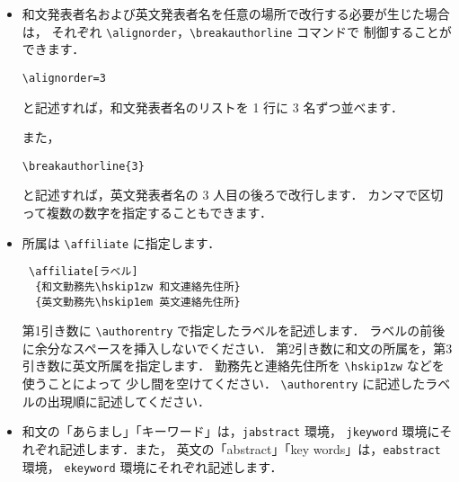 \documentclass[technicalreport]{ieicej}
\begin{document}
\begin{itemize}
\begin{itemize}
\item
第4引き数は発表者の所属ラベルを指定します．
このラベルは，後述する \verb/\affiliate/ の第1引き数に対応します．
ラベルは大学名，企業名，地名などを表す簡潔なものにしてください．
複数の所属がある場合には，カンマ ``,'' でラベルを区切って記述します．

{\bfseries 発表者が一人で所属がない場合}は，
\texttt{none} と指定します．

{\bfseries 発表者が複数で所属のない方がいる場合}は，
\texttt{none} 以外の適当なラベルを付けたうえで，
\verb/\affiliate/ は記述しません．

ラベルの前後やカンマの後ろに余分なスペースを入れないでください．
\verb/{Tokyo}/ と \verb*/{Tokyo }/ は所属が違うものと判断します．
\end{itemize}

\item
和文発表者名および英文発表者名を任意の場所で改行する必要が生じた場合は，
それぞれ \verb/\alignorder/，\verb/\breakauthorline/ コマンドで
制御することができます．
\begin{verbatim}
\alignorder=3
\end{verbatim}
と記述すれば，和文発表者名のリストを 1 行に 3 名ずつ並べます．

また，
\begin{verbatim}
\breakauthorline{3}
\end{verbatim}
と記述すれば，英文発表者名の 3 人目の後ろで改行します．
カンマで区切って複数の数字を指定することもできます．

\item
所属は \verb/\affiliate/ に指定します．
\begin{verbatim}
 \affiliate[ラベル]
  {和文勤務先\hskip1zw 和文連絡先住所}
  {英文勤務先\hskip1em 英文連絡先住所}
\end{verbatim}
第1引き数に \verb/\authorentry/ で指定したラベルを記述します．
ラベルの前後に余分なスペースを挿入しないでください．
第2引き数に和文の所属を，第3引き数に英文所属を指定します．
勤務先と連絡先住所を \verb/\hskip1zw/ などを使うことによって
少し間を空けてください．
\verb/\authorentry/ に記述したラベルの出現順に記述してください．

\item
和文の「あらまし」「キーワード」は，\texttt{jabstract} 環境，
\texttt{jkeyword} 環境にそれぞれ記述します．また，
英文の「abstract」「key words」は，\texttt{eabstract} 環境，
\texttt{ekeyword} 環境にそれぞれ記述します．
\end{itemize}
\end{document}
